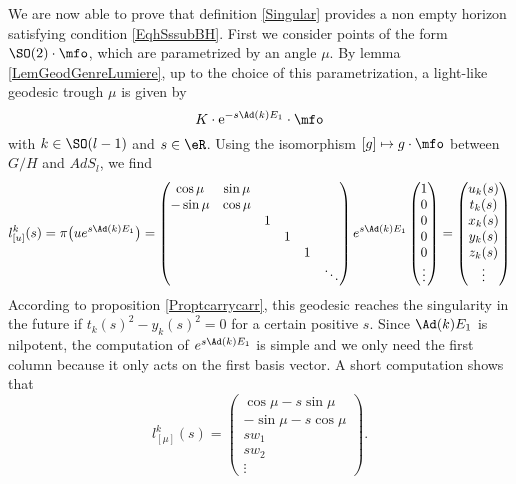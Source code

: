 We are now able to prove that definition \ref{Singular} provides a non empty horizon satisfying condition \eqref{EqhSssubBH}.  First we  consider points of the form $\SO(2)\cdot\mfo$, which are parametrized by an angle $\mu$. By lemma \ref{LemGeodGenreLumiere}, up to the choice of this parametrization, a light-like geodesic trough $\mu$ is given by
 \begin{equation}
   K\cdot \mbox{e}^{-s\Ad(k)E_1}\cdot\mfo
\end{equation}
with $k\in \SO(l-1)$ and  $s\in\eR$. Using the isomorphism $[g]\mapsto g\cdot \mfo$ between $G/H$ and $AdS_l$, we find
\begin{equation}		\label{EqhohnCondHOrExpl}
  l^k_{[u]}(s)= \pi\big( u e^{s\Ad(k)E_1} \big)=
\begin{pmatrix}
\cos\mu&\sin\mu\\
-\sin\mu&\cos\mu\\
&&1\\
&&&1\\
&&&&1\\
&&&&&\ddots
\end{pmatrix}
 e^{s\Ad(k)E_1}
\begin{pmatrix}
1\\0\\0\\0\\0\\\vdots
\end{pmatrix}
=
\begin{pmatrix}
u_{k}(s)\\t_{k}(s)\\x_{k}(s)\\y_{k}(s)\\z_{k}(s)\\\vdots
\end{pmatrix}
\end{equation}
According to proposition \ref{Proptcarrycarr}, this geodesic reaches the singularity in the future if $t_{k}(s)^{2}-y_{k}(s)^{2}=0$ for a certain positive $s$. Since $\Ad(k)E_1$ is nilpotent, the computation of $ e^{s\Ad(k)E_1}$ is simple and we only need the first column because it only acts on the first basis vector. A short computation shows that
\begin{equation}  \label{EqGedCompo}
  l_{[\mu]}^{k}(s)=
\begin{pmatrix}
\cos\mu-s\sin\mu\\
-\sin\mu-s\cos\mu\\
sw_{1}\\
sw_{2}\\
\vdots
\end{pmatrix}.
\end{equation}

